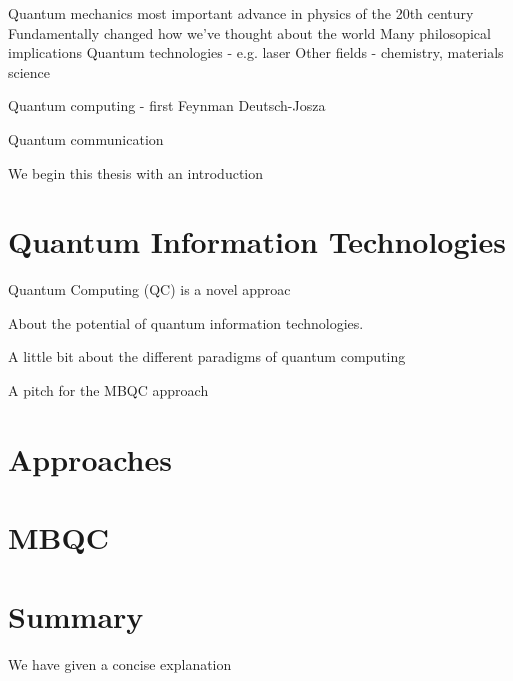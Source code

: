 Quantum mechanics most important advance in physics of the 20th century
Fundamentally changed how we've thought about the world
Many philosopical implications
Quantum technologies - e.g. laser
Other fields - chemistry, materials science

Quantum computing - first Feynman
Deutsch-Josza

Quantum communication






We begin this thesis with an introduction 

\section{Quantum Information Technologies}

Quantum Computing (QC) is a novel approac

About the potential of quantum information technologies.

A little bit about the different paradigms of quantum computing

A pitch for the MBQC approach


\section{Approaches}

\section{MBQC}

\section{Summary}

We have given a concise explanation 

